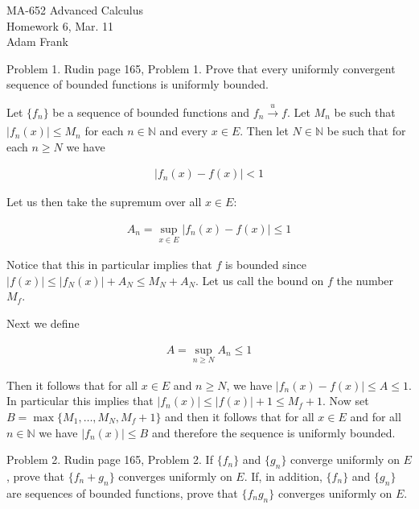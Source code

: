 \documentclass{article}
\begin{document}
  \begin{center} \Large
    MA-652 Advanced Calculus\\
    Homework 6, Mar. 11 \\
    Adam Frank
  \end{center}

  \vspace{1cm}
  
  {\Large \color{Sepia} Problem 1. Rudin page 165, Problem 1. Prove that every uniformly convergent sequence of bounded functions is uniformly bounded.}

  \vspace{1cm} 

  Let $\{f_n\}$ be a sequence of bounded functions and $f_n\xrightarrow[]{u}f$.  Let $M_n$ be such that $|f_n(x)|\le M_n$ for each $n\in\mathbb N$ and every $x\in E$.  Then let $N\in\mathbb N$ be such that for each $n\geq N$ we have 

  \begin{align*}
    |f_n(x)-f(x)|<1
  \end{align*}

  Let us then take the supremum over all $x\in E$: 

  \begin{align*}
    A_n=\sup_{x\in E}|f_n(x)-f(x)| \leq 1
  \end{align*}

  Notice that this in particular implies that $f$ is bounded since $|f(x)|\leq |f_N(x)|+A_N \le M_N+A_N$.  Let us call the bound on $f$ the number $M_f$. 
  
  Next we define  

  \begin{align*}
    A = \sup_{n\geq N}A_n \leq 1
  \end{align*}

  Then it follows that for all $x\in E$ and $n\geq N$, we have $|f_n(x)-f(x)|\leq A\leq 1$.  In particular this implies that $|f_n(x)|\leq |f(x)|+1\le 
  M_f+1$.  Now set $B=\max\{M_1,\dots,M_N,M_f+1\}$ and then it follows that for all $x\in E$ and for all $n\in\mathbb N$ we have $|f_n(x)|\leq B$ and therefore the sequence is uniformly bounded.

\pagebreak
  
  {\Large \color{Sepia} Problem 2. Rudin page 165, Problem 2. If $\{f_n\}$ and $\{g_n\}$ converge uniformly on $E$, prove that $\{f_n+g_n\}$ converges uniformly on $E$.  If, in addition, $\{f_n\}$ and $\{g_n\}$ are sequences of bounded functions, prove that $\{f_ng_n\}$ converges uniformly on $E$.}
\end{document}
